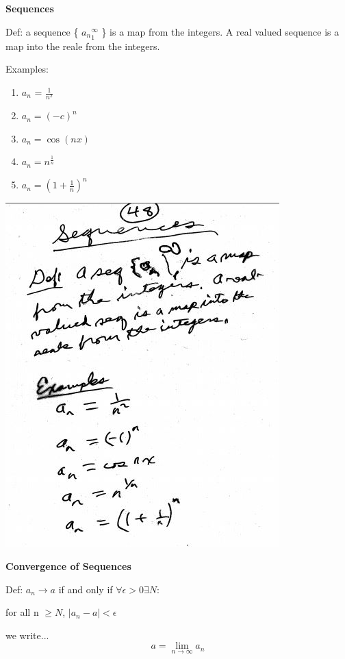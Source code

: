 \documentclass[10pt,a4paper]{article}
\begin{document}
{{\newpage
{\bf Sequences}


Def: a sequence \{ ${a_n}_{1}^\infty$ \} is a map from the integers. A real valued sequence is a map into the reale from the integers.

Examples:

\begin{enumerate} [{}]

\item $a{_n}$ = $\frac{1}{n^{2}}$
\item $a_{n} = (-c)^{n}$
\item $a_{n} = \cos(nx)$
\item $a_{n} = n^\frac{1}{n}$
\item $a_{n} = (1 + \frac{1}{n})^{n}$

\end{enumerate}

\includegraphics[scale=.8]{Pages/S&L_page48}

\newpage

{\bf Convergence of Sequences} 

Def: $a_{n} \rightarrow a$ if and only if $\forall \epsilon > 0\exists N$:

for all n $\geq N$, $|a_{n} - a| < \epsilon$

we write... $$a = \lim_{n \rightarrow \infty} a_{n}$$

}}
\end{document}
